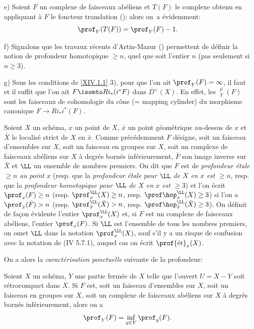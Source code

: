 \begin{remarques}
e) Soient $F$ un complexe de faisceaux ab\'eliens et $T(F)$ le complexe obtenu en appliquant \`a $F$ le foncteur translation (\cite{XIV.3}); alors on~a \'evidemment:
$$
\prof_Y(T(F))=\prof_Y(F)-1.
$$

f) Signalons que les travaux r\'ecents d'Artin-Mazur (\cite{XIV.1}) permettent de d\'efinir la notion de profondeur homotopique $\geq n$, quel que soit l'entier $n$ (pas seulement si $n\geq 3$).

g) Sous les conditions de \ref{XIV.1.1} 3), pour que l'on ait $\prof_Y(F)=\infty$, il faut et il suffit que l'on ait $F\isomto Ri_*(i^*F)$ dans $D^+(X)$. En effet, les ${\mathop{\underline{\mathrm{H}}}\nolimits}_Y^p(F)$ sont les faisceaux de cohomologie du c\^{o}ne (= mapping cylinder) du morphisme canonique $F\to Ri_*i^*(F)$.
\end{remarques}

\begin{definition} \label{XIV.1.7}
Soient $X$ un sch\'ema, $x$ un point de $X$, $\bar x$ un point g\'eom\'etrique au-dessus de $x$ et $\bar X$ le localis\'e strict de $X$ en $\bar x$. Comme pr\'ec\'edemment $F$ d\'esigne, soit un faisceau d'ensembles sur $X$, soit un faisceau en groupes sur $X$, soit un complexe de faisceaux ab\'eliens sur $X$ \`a degr\'es born\'es inf\'erieurement, $\bar F$ son image inverse sur~$\bar X$ et $\LL$ un ensemble de nombres premiers. On dit que $F$ est de \emph{profondeur étale $\geq n$ au point $x$} (resp. que la \emph{profondeur étale pour $\LL$ de $X$ en $x$ est $\geq n$}, resp. que la \emph{profondeur homotopique pour $\LL$ de $X$ en $x$ est $\geq 3$}) et l'on \'ecrit $\prof_x(F)\geq n$ (resp. $\prof_x^{\LL}(X)\geq n$, resp. $\prof \hop_x^{\LL}(X)\geq 3$) si l'on a $\prof_{\bar x}(\bar F)>n$ (resp. $\prof_{\bar x}^{\LL}(\bar X)> n$, resp. $\prof \hop_{\bar x}^{\LL}(\bar X)\geq 3$). On d\'efinit de fa\c con \'evidente l'entier $\prof_x^{\LL}(X)$ et, si $F$ est un complexe de faisceaux ab\'eliens, l'entier $\prof_x(F)$. Si $\LL$ est l'ensemble de tous les nombres premiers, on omet $\LL$ dans la notation $\prof_x^{\LL}(X)$, sauf s'il y a un risque de confusion avec la notation de \textup{(\EGA IV 5.7.1)}, auquel cas on \'ecrit $\prof {\textup{ét}}_x(X)$.
\end{definition}

On a alors la \textit{caractérisation ponctuelle} suivante de la profondeur:

\begin{theoreme} \label{XIV.1.8} Soient $X$ un sch\'ema, $Y$ une partie ferm\'ee de $X$ telle que l'ouvert $U=X-Y$ soit r\'etrocompact dans $X$. Si $F$ est, soit un faisceau d'ensembles sur $X$, soit un faisceau en groupes sur $X$, soit un complexe de faisceaux ab\'eliens sur $X$ \`a degr\'es born\'es inf\'erieurement, alors on a
$$
\prof_Y(F)=\inf_{y\in Y} \prof_y(F).
$$
\end{theoreme}

